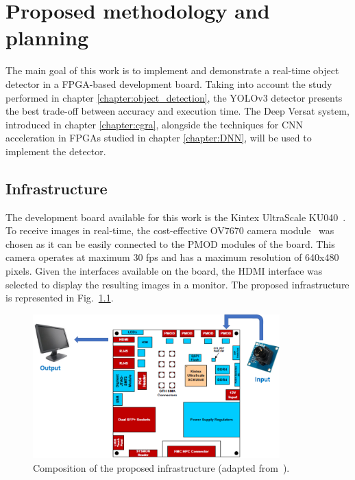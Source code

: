\chapter{Proposed methodology and planning}
\label{chapter:methodology}

The main goal of this work is to implement and demonstrate a real-time object detector in a FPGA-based development board. Taking into account the study performed in chapter \ref{chapter:object_detection}, the YOLOv3 detector presents the best trade-off between accuracy and execution time. The Deep Versat system, introduced in chapter \ref{chapter:cgra}, alongside the techniques for CNN acceleration in FPGAs studied in chapter \ref{chapter:DNN}, will be used to implement the detector.

\section{Infrastructure}
\label{section:infrastructure}

The development board available for this work is the Kintex UltraScale KU040~\cite{fpga}. To receive images in real-time, the cost-effective OV7670 camera module~\cite{camera} was chosen as it can be easily connected to the PMOD modules of the board. This camera operates at maximum 30 fps and has a maximum resolution of 640x480 pixels. Given the interfaces available on the board, the HDMI interface was selected to display the resulting images in a monitor. The proposed infrastructure is represented in Fig.~\ref{fig:infrastructure}. 

\begin{figure}[!htb]
  \centering
  \includegraphics[width=0.85\textwidth]{Figures/fpga_system.png}
  \caption{Composition of the proposed infrastructure (adapted from~\cite{fpga}).}
  \label{fig:infrastructure}
\end{figure}


